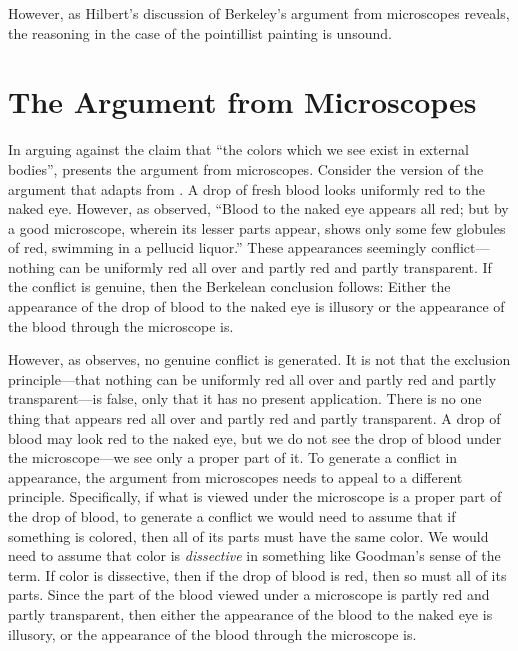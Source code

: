 \documentclass[12pt]{article}
\begin{document}
However, as Hilbert's \citeyear{Hilbert:1987jq} discussion of Berkeley's \citeyear{Berkeley:1734fk} argument from microscopes reveals, the reasoning in the case of the pointillist painting is unsound.


\section{The Argument from Microscopes}\label{sub:the_argument_from_microscopes} %

In arguing against the claim that ``the colors which we see exist in external bodies'', \citet{Berkeley:1734fk} presents the argument from microscopes. Consider the version of the argument that \citet{Hilbert:1987jq} adapts from \citet{Marc-Wogau:1968kx}. A drop of fresh blood looks uniformly red to the naked eye. However, as \citet[book 2, chapter 23, section 11]{Locke:1706hc} observed, ``Blood to the naked eye appears all red; but by a good microscope, wherein its lesser parts appear, shows only some few globules of red, swimming in a pellucid liquor.'' These appearances seemingly conflict---nothing can be uniformly red all over and partly red and partly transparent. If the conflict is genuine, then the Berkelean conclusion follows: Either the appearance of the drop of blood to the naked eye is illusory or the appearance of the blood through the microscope is. 

However, as \citet{Hilbert:1987jq} observes, no genuine conflict is generated. It is not that the exclusion principle---that nothing can be uniformly red all over and partly red and partly transparent---is false, only that it has no present application. There is no one thing that appears red all over and partly red and partly transparent. A drop of blood may look red to the naked eye, but we do not see the drop of blood under the microscope---we see only a proper part of it. To generate a conflict in appearance, the argument from microscopes needs to appeal to a different principle. Specifically, if what is viewed under the microscope is a proper part of the drop of blood, to generate a conflict we would need to assume that if something is colored, then all of its parts must have the same color. We would need to assume that color is \emph{dissective} in something like Goodman's \citeyearpar[53]{Goodman:1951ww} sense of the term. If color is dissective, then if the drop of blood is red, then so must all of its parts. Since the part of the blood viewed under a microscope is partly red and partly transparent, then either the appearance of the blood to the naked eye is illusory, or the appearance of the blood through the microscope is.
\end{document}
